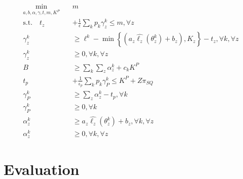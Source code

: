 \documentclass[11pt]{article}
\begin{document}
    \begin{align}
        \min_{a,b,\alpha,\gamma,t,m,K^P} \quad & m\\
        \text{s.t.} \quad t_z &+ \frac{1}{\epsilon} \sum_k p_k \gamma_z^k \leq m, \forall z\\
        \gamma_z^k &\geq \ell^k - \min\left\{(a_z\hat{\ell_z}(\theta_z^k) + b_z), K_z\right\} -t_z, \forall k, \forall z \\
        \gamma_z^k &\geq 0, \forall k, \forall z\\
        B &\geq \sum_k \sum_z \alpha^k_z + c_k K^P\\
        t_p &+ \frac{1}{\epsilon_p} \sum_k p_k \gamma_P^k \leq K^P+Z\pi_{SQ}\\
        \gamma_P^k &\geq \sum_z \alpha^k_z -t_p, \forall k \\
        \gamma_P^k &\geq 0, \forall k\\
        \alpha^k_z &\geq a_z \hat{\ell_z}(\theta^k_z) + b_z, \forall k, \forall z\\
        \alpha^k_z &\geq 0, \forall k, \forall z
    \end{align}

\section{Evaluation}
\end{document}

